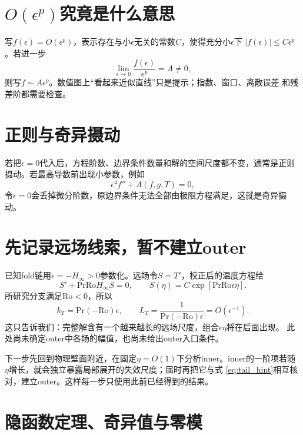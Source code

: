\documentclass[UTF8,zihao=-4,openany]{ctexbook}
\newcommand{\eps}{\epsilon}
\newcommand{\Ro}{\mathrm{Ro}}
\newcommand{\Pran}{\mathrm{Pr}}
\begin{document}
\section{$O(\eps^p)$究竟是什么意思}

写$f(\eps)=O(\eps^p)$，表示存在与小$\eps$无关的常数$C$，使得充分小$\eps$下
$|f(\eps)|\le C\eps^p$。若进一步
\begin{equation}
 \lim_{\eps\to0}\frac{f(\eps)}{\eps^p}=A\ne0,
\end{equation}
则写$f\sim A\eps^p$。数值图上“看起来近似直线”只是提示；指数、窗口、离散误差
和残差阶都需要检查。

\section{正则与奇异摄动}

若把$\eps=0$代入后，方程阶数、边界条件数量和解的空间尺度都不变，通常是正则
摄动。若最高导数前出现小参数，例如
\begin{equation}
 \eps^4 f''+A(f,g,T)=0,
\end{equation}
令$\eps=0$会丢掉微分阶数，原边界条件无法全部由极限方程满足，这就是奇异摄动。

\section{先记录远场线索，暂不建立outer}

已知fold链用$\eps=-H_\infty>0$参数化。远场令$S=T'$，校正后的温度方程给
\begin{equation}
 S'+\Pran\Ro H_\infty S=0,
 \qquad
 S(\eta)=C\exp[\Pran\Ro\eps\eta].
\end{equation}
所研究分支满足$\Ro<0$，所以
\begin{equation}\label{eq:tail_hint}
 k_T=\Pran(-\Ro)\eps,
 \qquad
 L_T=\frac{1}{\Pran(-\Ro)\eps}=O(\eps^{-1}).
\end{equation}
这只告诉我们：完整解含有一个越来越长的远场尺度，组合$\eps\eta$将在后面出现。
此处尚未确定outer中各场的幅值，也尚未给出outer入口条件。

下一步先回到物理壁面附近，在固定$\eta=O(1)$下分析inner。inner的一阶项若随
$\eta$增长，就会独立暴露局部展开的失效尺度；届时再把它与式
\eqref{eq:tail_hint}相互核对，建立outer。这样每一步只使用此前已经得到的结果。

\section{隐函数定理、奇异值与零模}
\end{document}

